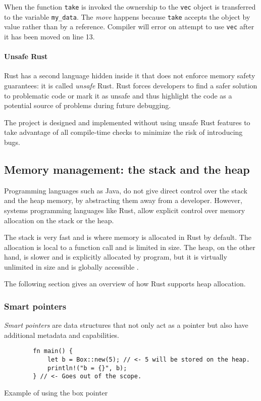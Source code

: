 When the function \texttt{take} is invoked the ownership to the \texttt{vec} object is transferred to the variable \texttt{my_data}. The \emph{move} happens because \texttt{take} accepts the object by value rather than by a reference. Compiler will error on attempt to use \texttt{vec} after it has been moved on line 13.

\paragraph{Unsafe Rust}
Rust has a second language hidden inside it that does not enforce memory safety guarantees: it is called \emph{unsafe} Rust. Rust forces developers to find a safer solution to problematic code or mark it as unsafe and thus highlight the code as a potential source of problems during future debugging.

The \pvecrs{} project is designed and implemented without using unsafe Rust features to take advantage of all compile-time checks to minimize the risk of introducing bugs.

\subsection{Memory management: the stack and the heap}
Programming languages such as Java, do not give direct control over the stack and the heap memory, by abstracting them away from a developer. However, systems programming languages like Rust, allow explicit control over memory allocation on the stack or the heap.

The stack is very fast and is where memory is allocated in Rust by default. The allocation is local to a function call and is limited in size. The heap, on the other hand, is slower and is explicitly allocated by program, but it is virtually unlimited in size and is globally accessible \cite{rust-book-2e}.

The following section gives an overview of how Rust supports heap allocation.

\subsubsection*{Smart pointers}
\emph{Smart pointers} are data structures that not only act as a pointer but also have additional metadata and capabilities.

\begin{listing}[!ht]

    \centering
    \begin{verbatim}
        fn main() {
            let b = Box::new(5); // <- 5 will be stored on the heap.
            println!("b = {}", b);
        } // <- Goes out of the scope.
    \end{verbatim}

    \caption{Example of using the box pointer}
    \label{lst:box}
\end{listing}

